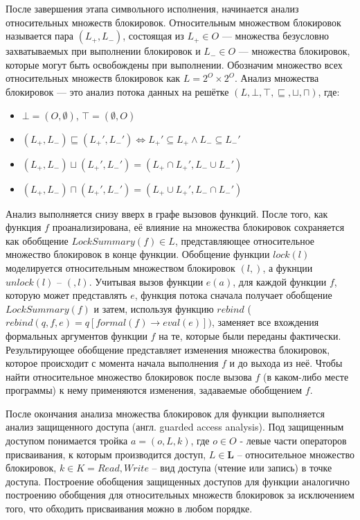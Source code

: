 После завершения этапа символьного исполнения, начинается анализ относительных множеств блокировок. Относительным множеством блокировок называется пара $(L_{+}, L_{-})$, состоящая из $L_{+} \in O$ — множества безусловно захватываемых при выполнении блокировок и $L_{-} \in O$ — множества блокировок, которые могут быть освобождены при выполнении. Обозначим множество всех относительных множеств блокировок как $L = 2^{O} \times 2^{O}$. Анализ множества блокировок — это анализ потока данных на решётке $(L, \bot, \top, \sqsubseteq, \sqcup, \sqcap)$, где:
\begin{itemize}
\item $\bot = (O, \emptyset)$, $\top = (\emptyset, O)$
\item $(L_{+}, L_{-}) \sqsubseteq (L_{+}', L_{-}') \Longleftrightarrow L_{+}' \subseteq L_{+} \wedge L_{-} \subseteq L_{-}'$
\item $(L_{+}, L_{-}) \sqcup (L_{+}', L_{-}') = (L_{+} \cap L_{+}', L_{-} \cup L_{-}')$
\item $(L_{+}, L_{-}) \sqcap (L_{+}', L_{-}') = (L_{+} \cup L_{+}', L_{-} \cap L_{-}')$
\end{itemize}

Анализ выполняется снизу вверх в графе вызовов функций. После того, как функция $f$  проанализирована, её влияние на множества блокировок сохраняется как обобщение $LockSummary(f) \in L$, представляющее относительное множество блокировок в конце функции. Обобщение функции $lock(l)$  моделируется относительным множеством блокировок $({l}, {})$, а фукнции $unlock(l)$ – $({}, {l})$. Учитывая вызов функции $e(a)$, для каждой функции $f$, которую может представлять $e$, функция потока сначала получает обобщение $LockSummary(f)$ и затем, используя функцию $rebind$ ($rebind(q, f, e) = q[formal(f ) → eval(e)])$, заменяет все вхождения формальных аргументов функции $f$ на те, которые были переданы фактически. Результирующее обобщение представляет изменения множества блокировок, которое происходит с момента начала выполнения $f$ и до выхода из неё. Чтобы найти относительное множество блокировок после вызова $f$ (в каком-либо месте программы) к нему применяются изменения, задаваемые обобщением $f$.

После окончания анализа множества блокировок для функции выполняется анализ защищенного доступа (англ. guarded access analysis). Под защищенным доступом понимается тройка $a = (o, L, k)$, где $o \in O$ - левые части операторов присваивания, к которым производится доступ, $L \in \mathbf{L}$ – относительное множество блокировок, $k \in K = {Read, Write}$ – вид доступа (чтение или запись) в точке доступа. Построение обобщения защищенных доступов для функции аналогично построению обобщения для относительных множеств блокировок за исключением того, что обходить присваивания можно в любом порядке.

